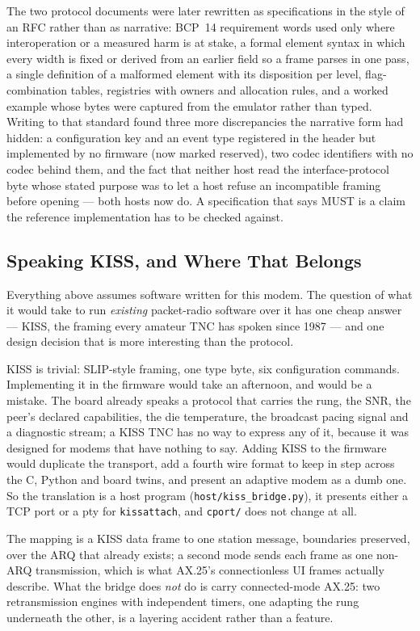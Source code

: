 The two protocol documents were later rewritten as specifications in
the style of an RFC rather than as narrative: BCP~14 requirement words
used only where interoperation or a measured harm is at stake, a
formal element syntax in which every width is fixed or derived from an
earlier field so a frame parses in one pass, a single definition of a
malformed element with its disposition per level, flag-combination
tables, registries with owners and allocation rules, and a worked
example whose bytes were captured from the emulator rather than typed.
Writing to that standard found three more discrepancies the narrative
form had hidden: a configuration key and an event type registered in
the header but implemented by no firmware (now marked reserved), two
codec identifiers with no codec behind them, and the fact that neither
host read the interface-protocol byte whose stated purpose was to let
a host refuse an incompatible framing before opening --- both hosts
now do.  A specification that says MUST is a claim the reference
implementation has to be checked against.

\subsection{Speaking KISS, and Where That Belongs}
\label{sec:cport_kiss}

Everything above assumes software written for this modem.  The question
of what it would take to run \emph{existing} packet-radio software over
it has one cheap answer --- KISS, the framing every amateur TNC has
spoken since 1987 --- and one design decision that is more interesting
than the protocol.

KISS is trivial: SLIP-style framing, one type byte, six configuration
commands.  Implementing it in the firmware would take an afternoon, and
would be a mistake.  The board already speaks a protocol that carries
the rung, the SNR, the peer's declared capabilities, the die
temperature, the broadcast pacing signal and a diagnostic stream; a
KISS TNC has no way to express any of it, because it was designed for
modems that have nothing to say.  Adding KISS to the firmware would
duplicate the transport, add a fourth wire format to keep in step
across the C, Python and board twins, and present an adaptive modem as
a dumb one.  So the translation is a host program
(\texttt{host/kiss\_bridge.py}), it presents either a TCP port or a pty
for \texttt{kissattach}, and \texttt{cport/} does not change at all.

The mapping is a KISS data frame to one station message, boundaries
preserved, over the ARQ that already exists; a second mode sends each
frame as one non-ARQ transmission, which is what AX.25's connectionless
UI frames actually describe.  What the bridge does \emph{not} do is
carry connected-mode AX.25: two retransmission engines with independent
timers, one adapting the rung underneath the other, is a layering
accident rather than a feature.

